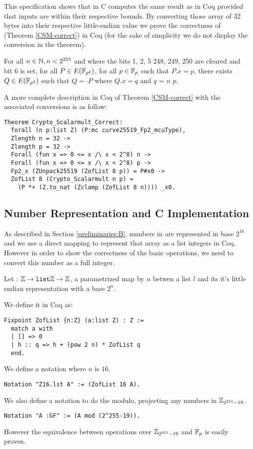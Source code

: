This specification shows that  in C computes the same
result as  in Coq provided that inputs are within their respective
bounds.
By converting those array of 32 bytes into their respective little-endian value
we prove the correctness of  (Theorem \ref{CSM-correct})
in Coq (for the sake of simplicity we do not display the conversion in the theorem).
\begin{theorem}
\label{CSM-correct}
For all $n \in \mathbb{N}, n < 2^{255}$ and where the bits 1, 2, 5 248, 249, 250
are cleared and bit 6 is set, for all $P \in E(\mathbb{F}_{p^2})$,
for all $p \in \mathbb{F}_{p}$ such that $P.x = p$,
there exists $Q \in E(\mathbb{F}_{p^2})$ such that $Q = \cdot P$ where $Q.x = q$ and $q$ =  $n$ $p$.
\end{theorem}
A more complete description in Coq of Theorem \ref{CSM-correct} with the associated conversions
is as follow:
\begin{lstlisting}[language=Coq]
Theorem Crypto_Scalarmult_Correct:
  forall (n p:list Z) (P:mc curve25519_Fp2_mcuType),
  Zlength n = 32 ->
  Zlength p = 32 ->
  Forall (fun x => 0 <= x /\ x < 2^8) n ->
  Forall (fun x => 0 <= x /\ x < 2^8) p ->
  Fp2_x (ZUnpack25519 (ZofList 8 p)) = P#x0 ->
  ZofList 8 (Crypto_Scalarmult n p) =
    (P *+ (Z.to_nat (Zclamp (ZofList 8 n)))) _x0.
\end{lstlisting}

\subsection{Number Representation and C Implementation}

As described in Section \ref{preliminaries:B}, numbers in  are represented
in base $2^{16}$ and we use a direct mapping to represent that array as a list
integers in Coq. However in order to show the correctness of the basic operations,
we need to convert this number as a full integer.
\begin{definition}
Let  : $\mathbb{Z} \rightarrow \texttt{list} \mathbb{Z} \rightarrow \mathbb{Z}$, a parametrized map by $n$ betwen a list $l$ and its
it's little endian representation with a base $2^n$.
\end{definition}
We define it in Coq as:
\begin{lstlisting}[language=Coq]
Fixpoint ZofList {n:Z} (a:list Z) : Z :=
  match a with
  | [] => 0
  | h :: q => h + (pow 2 n) * ZofList q
  end.
\end{lstlisting}
We define a notation where $n$ is $16$.
\begin{lstlisting}[language=Coq]
Notation "Z16.lst A" := (ZofList 16 A).
\end{lstlisting}
We also define a notation to do the modulo, projecting any numbers in $\mathbb{Z}_{2^{255}-19}$.
\begin{lstlisting}[language=Coq]
Notation "A :GF" := (A mod (2^255-19)).
\end{lstlisting}
However the equivalence between operations over $\mathbb{Z}_{2^{255}-19}$ and $\mathbb{F}_{p}$ is easily proven.

